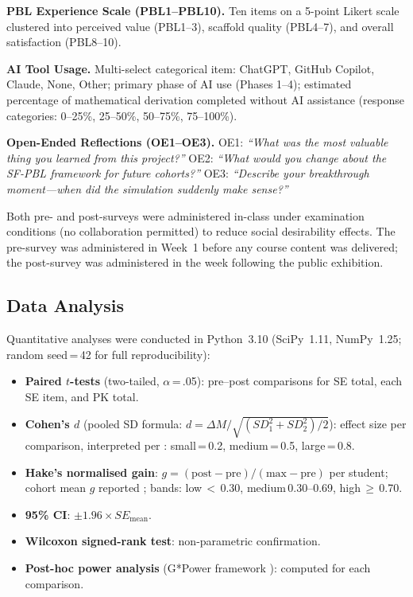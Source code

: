\documentclass[utf8]{FrontiersinHarvard}
\begin{document}
\textbf{PBL Experience Scale (PBL1--PBL10).} Ten items on a 5-point
Likert scale clustered into perceived value (PBL1--3), scaffold quality
(PBL4--7), and overall satisfaction (PBL8--10).

\textbf{AI Tool Usage.} Multi-select categorical item: ChatGPT, GitHub
Copilot, Claude, None, Other; primary phase of AI use (Phases 1--4);
estimated percentage of mathematical derivation completed without AI
assistance (response categories: 0--25\%, 25--50\%, 50--75\%, 75--100\%).

\textbf{Open-Ended Reflections (OE1--OE3).}
OE1: \textit{``What was the most valuable thing you learned from this
project?''} OE2: \textit{``What would you change about the SF-PBL framework
for future cohorts?''} OE3: \textit{``Describe your breakthrough moment---when
did the simulation suddenly make sense?''}

Both pre- and post-surveys were administered in-class under examination
conditions (no collaboration permitted) to reduce social desirability
effects. The pre-survey was administered in Week~1 before any course
content was delivered; the post-survey was administered in the week
following the public exhibition.

\subsection{Data Analysis}

Quantitative analyses were conducted in Python~3.10 (SciPy~1.11,
NumPy~1.25; random seed\,=\,42 for full reproducibility):

\begin{itemize}\setlength{\itemsep}{0pt}\setlength{\parskip}{0pt}
  \item \textbf{Paired $t$-tests} (two-tailed, $\alpha$\,=\,.05): pre--post
    comparisons for SE total, each SE item, and PK total.

  \item \textbf{Cohen's $d$} (pooled SD formula:
    $d = \Delta M / \sqrt{(SD_1^2 + SD_2^2)/2}$): effect size per comparison,
    interpreted per \citet{cohen1988statistical}: small\,=\,0.2,
    medium\,=\,0.5, large\,=\,0.8.

  \item \textbf{Hake's normalised gain}:
    $g = (\text{post} - \text{pre}) / (\text{max} - \text{pre})$ per
    student; cohort mean $g$ reported \citep{hake1998interactive};
    bands: low\,$<$\,0.30, medium\,0.30--0.69, high\,$\geq$\,0.70.

  \item \textbf{95\% CI}: $\pm 1.96 \times SE_{\text{mean}}$.

  \item \textbf{Wilcoxon signed-rank test}: non-parametric confirmation.

  \item \textbf{Post-hoc power analysis} (G*Power framework
    \citep{faul2007gpower}): computed for each comparison.
\end{itemize}
\end{document}
